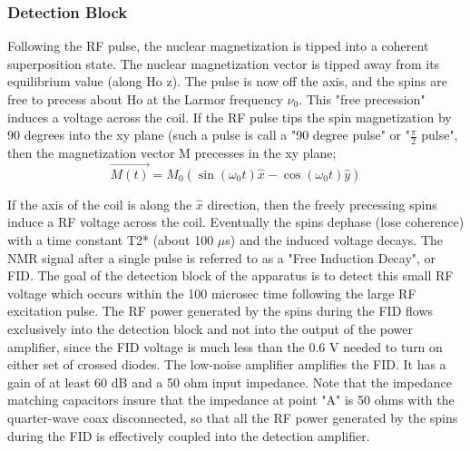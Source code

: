 \documentclass{../lab}
\begin{document}
\subsubsection{Detection Block}

Following the RF pulse, the nuclear magnetization is tipped into a coherent superposition state. The nuclear magnetization vector is tipped away from its equilibrium value (along Ho z). The pulse is now off the axis, and the spins are free to precess about Ho at the Larmor frequency $\nu_0$. This "free precession" induces a voltage across the coil. If the RF pulse tips the spin magnetization by 90 degrees into the xy plane (such a pulse is call a "90 degree pulse" or "$\frac{\pi}{2}$ pulse", then the magnetization vector M precesses in the xy plane;
\begin{equation}
    \vec{M(t)} = M_0 (\sin(\omega_0t)\hat{x} - \cos(\omega_0t)\hat{y})
\end{equation}

If the axis of the coil is along the $\hat{x}$ direction, then the freely precessing spins induce a RF voltage across the coil. Eventually the spins dephase (lose coherence) with a time constant T2* (about 100 $\mu$s) and the induced voltage decays. The NMR signal after a single pulse is referred to as a "Free Induction Decay", or FID. The goal of the detection block of the apparatus is to detect this small RF voltage which occurs within the 100 microsec time following the large RF excitation pulse. The RF power generated by the spins during the FID flows exclusively into the detection block and not into the output of the power amplifier, since the FID voltage is much less than the 0.6 V needed to turn on either set of crossed diodes. The low-noise amplifier amplifies the FID. It has a gain of at least 60 dB and a 50 ohm input impedance. Note that the impedance matching capacitors insure that the impedance at point "A" is 50 ohms with the quarter-wave coax disconnected, so that all the RF power generated by the spins during the FID is effectively coupled into the detection amplifier.
\end{document}
